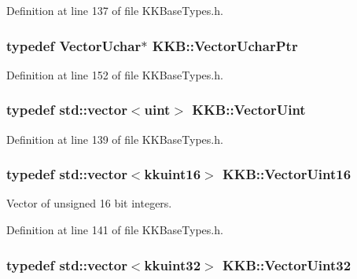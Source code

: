 Definition at line 137 of file K\+K\+Base\+Types.\+h.

\subsubsection[{\texorpdfstring{Vector\+Uchar\+Ptr}{VectorUcharPtr}}]{\setlength{\rightskip}{0pt plus 5cm}typedef {\bf Vector\+Uchar}$\ast$ {\bf K\+K\+B\+::\+Vector\+Uchar\+Ptr}}\hypertarget{namespace_k_k_b_ac43cb621a63d628438a729543638a404}{}\label{namespace_k_k_b_ac43cb621a63d628438a729543638a404}


Definition at line 152 of file K\+K\+Base\+Types.\+h.

\subsubsection[{\texorpdfstring{Vector\+Uint}{VectorUint}}]{\setlength{\rightskip}{0pt plus 5cm}typedef std\+::vector$<${\bf uint}$>$ {\bf K\+K\+B\+::\+Vector\+Uint}}\hypertarget{namespace_k_k_b_a199042935a7ad6d22354bc8f0090b938}{}\label{namespace_k_k_b_a199042935a7ad6d22354bc8f0090b938}


Definition at line 139 of file K\+K\+Base\+Types.\+h.

\subsubsection[{\texorpdfstring{Vector\+Uint16}{VectorUint16}}]{\setlength{\rightskip}{0pt plus 5cm}typedef std\+::vector$<${\bf kkuint16}$>$ {\bf K\+K\+B\+::\+Vector\+Uint16}}\hypertarget{namespace_k_k_b_a4f57cb1872dd1448f1e20798475afc06}{}\label{namespace_k_k_b_a4f57cb1872dd1448f1e20798475afc06}


Vector of unsigned 16 bit integers. 



Definition at line 141 of file K\+K\+Base\+Types.\+h.

\subsubsection[{\texorpdfstring{Vector\+Uint32}{VectorUint32}}]{\setlength{\rightskip}{0pt plus 5cm}typedef std\+::vector$<${\bf kkuint32}$>$ {\bf K\+K\+B\+::\+Vector\+Uint32}}\hypertarget{namespace_k_k_b_ab5f0d7bc82b746e1e75e48a6394ccb60}{}\label{namespace_k_k_b_ab5f0d7bc82b746e1e75e48a6394ccb60}


